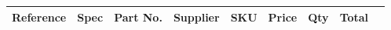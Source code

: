 \documentclass{article}
\begin{document}


\begin{center}
    \begin{longtable}{| p{3.8cm} | p{4.7cm} | l | l | l | l | r | r | r |}
    \hline
	\multicolumn{1}{|l|}{\textbf{Reference}} & \multicolumn{1}{|l|}{\textbf{Spec}} & \multicolumn{1}{l|}{\textbf{Part No.}} & \multicolumn{1}{l|}{\textbf{Supplier}} & \multicolumn{1}{l|}{\textbf{SKU}} & \multicolumn{1}{r|}{\textbf{Price}} & \multicolumn{1}{r|}{\textbf{Qty}} & \multicolumn{1}{r|}{\textbf{Total}} \\ \hline	 
	\endhead
	
    \end{longtable}
\end{center}


\end{document}
